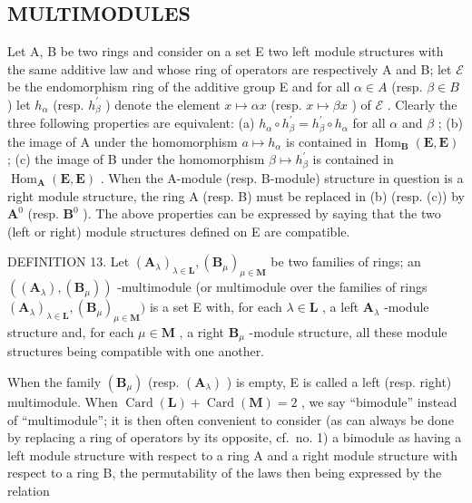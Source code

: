 \subsection{MULTIMODULES}

Let A, B be two rings and consider on a set E two left module structures with the same additive law and whose ring of operators are respectively A and B; let \(\mathcal{E}\) be the endomorphism ring of the additive group E and for all \(\alpha \in A\) (resp. \(\beta \in B\) ) let \(h_{\alpha}\) (resp. \(h_{\beta}^{\prime}\) ) denote the element \(x \mapsto \alpha x\) (resp. \(x \mapsto \beta x\) ) of \(\mathcal{E}\) . Clearly the three following properties are equivalent: (a) \(h_{\alpha} \circ h_{\beta}^{\prime} = h_{\beta}^{\prime} \circ h_{\alpha}\) for all \(\alpha\) and \(\beta\) ; (b) the image of A under the homomorphism \(a \mapsto h_{\alpha}\) is contained in \(\operatorname{Hom}_{\mathbf{B}}(\mathbf{E}, \mathbf{E})\) ; (c) the image of B under the homomorphism \(\beta \mapsto h_{\beta}^{\prime}\) is contained in \(\operatorname{Hom}_{\mathbf{A}}(\mathbf{E}, \mathbf{E})\) . When the A-module (resp. B-module) structure in question is a right module structure, the ring A (resp. B) must be replaced in (b) (resp. (c)) by \(\mathbf{A}^{0}\) (resp. \(\mathbf{B}^{0}\) ). The above properties can be expressed by saying that the two (left or right) module structures defined on E are compatible.

DEFINITION 13. Let \((\mathbf{A}_{\lambda})_{\lambda \in \mathbf{L}}, (\mathbf{B}_{\mu})_{\mu \in \mathbf{M}}\) be two families of rings; an \(((\mathbf{A}_{\lambda}), (\mathbf{B}_{\mu}))\) -multimodule (or multimodule over the families of rings \((\mathbf{A}_{\lambda})_{\lambda \in \mathbf{L}}, (\mathbf{B}_{\mu})_{\mu \in \mathbf{M}})\) is a set E with, for each \(\lambda \in \mathbf{L}\) , a left \(\mathbf{A}_{\lambda}\) -module structure and, for each \(\mu \in \mathbf{M}\) , a right \(\mathbf{B}_{\mu}\) -module structure, all these module structures being compatible with one another.

When the family \((\mathbf{B}_{\mu})\) (resp. \((\mathbf{A}_{\lambda})\) ) is empty, E is called a left (resp. right) multimodule. When \(\operatorname{Card}(\mathbf{L}) + \operatorname{Card}(\mathbf{M}) = 2\) , we say ``bimodule'' instead of ``multimodule''; it is then often convenient to consider (as can always be done by replacing a ring of operators by its opposite, cf.~no. 1) a bimodule as having a left module structure with respect to a ring A and a right module structure with respect to a ring B, the permutability of the laws then being expressed by the relation

